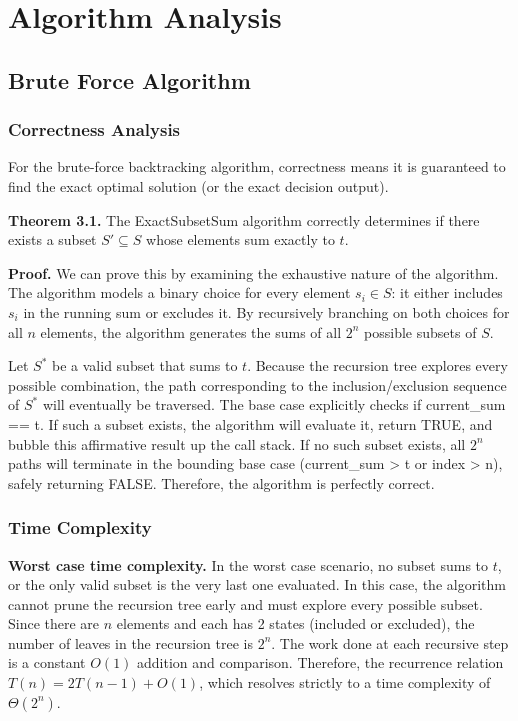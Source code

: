 \documentclass[12pt,a4paper]{article}
\begin{document}
\section{Algorithm Analysis}

\subsection{Brute Force Algorithm}

\subsubsection{Correctness Analysis}
For the brute-force backtracking algorithm, correctness means it is guaranteed to find the exact optimal solution (or the exact decision output).

\textbf{Theorem 3.1.} The ExactSubsetSum algorithm correctly determines if there exists a subset $S' \subseteq S$ whose elements sum exactly to $t$.

\textbf{Proof.} We can prove this by examining the exhaustive nature of the algorithm. The algorithm models a binary choice for every element $s_i \in S$: it either includes $s_i$ in the running sum or excludes it. By recursively branching on both choices for all $n$ elements, the algorithm generates the sums of all $2^n$ possible subsets of $S$.

Let $S^*$ be a valid subset that sums to $t$. Because the recursion tree explores every possible combination, the path corresponding to the inclusion/exclusion sequence of $S^*$ will eventually be traversed. The base case explicitly checks if current\_sum == t. If such a subset exists, the algorithm will evaluate it, return TRUE, and bubble this affirmative result up the call stack. If no such subset exists, all $2^n$ paths will terminate in the bounding base case (current\_sum > t or index > n), safely returning FALSE. Therefore, the algorithm is perfectly correct.

\subsubsection{Time Complexity}
\textbf{Worst case time complexity.} In the worst case scenario, no subset sums to $t$, or the only valid subset is the very last one evaluated. In this case, the algorithm cannot prune the recursion tree early and must explore every possible subset. Since there are $n$ elements and each has 2 states (included or excluded), the number of leaves in the recursion tree is $2^n$. The work done at each recursive step is a constant $O(1)$ addition and comparison. Therefore, the recurrence relation $T(n) = 2T(n-1) + O(1)$, which resolves strictly to a time complexity of $\Theta(2^n)$.
\end{document}
